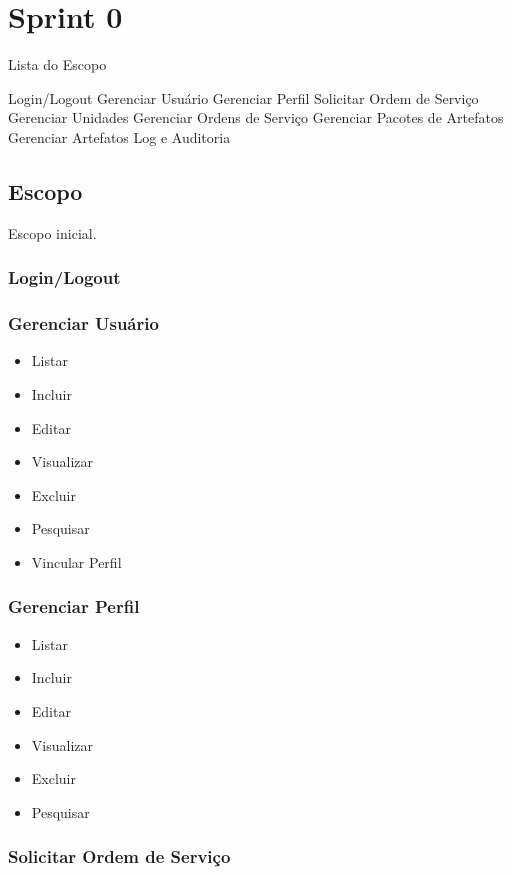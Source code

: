 \chapter{Sprint 0}


Lista do Escopo

Login/Logout
Gerenciar Usuário
Gerenciar Perfil
Solicitar Ordem de Serviço
Gerenciar Unidades
Gerenciar Ordens de Serviço
Gerenciar Pacotes de Artefatos
Gerenciar Artefatos
Log e Auditoria


\section{Escopo}

Escopo inicial.

\subsection{Login/Logout}

\subsection{Gerenciar Usuário}

\begin{itemize}
	\item 	Listar
	\item 	Incluir
	\item 	Editar
	\item 	Visualizar
	\item 	Excluir
	\item 	Pesquisar
	\item 	Vincular Perfil
\end{itemize}

\subsection{Gerenciar Perfil}

\begin{itemize}
	\item 	Listar
	\item 	Incluir
	\item 	Editar
	\item 	Visualizar
	\item 	Excluir
	\item 	Pesquisar
\end{itemize}

\subsection{Solicitar Ordem de Serviço}


